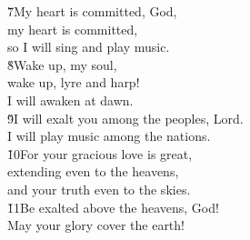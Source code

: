\begin{poetry}
\poeml \v{7}My heart is committed, God, \\
\poemll    my heart is committed, \\
\poemlll       so I will sing and play music. \\
\poeml \v{8}Wake up, my soul, \\
\poemll    wake up, lyre and harp! \\
\poemlll       I will awaken at dawn. \\
\poeml \v{9}I will exalt you among the peoples, Lord. \\
\poemll    I will play music among the nations. \\
\poeml \v{10}For your gracious love is great, \\
\poemll    extending even to the heavens, \\
\poemlll       and your truth even to the skies. \\
\poeml \v{11}Be exalted above the heavens, God! \\
\poemll    May your glory cover the earth!
\end{poetry}

